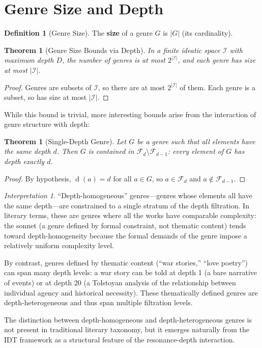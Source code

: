 \documentclass[11pt,openany]{book}
\theoremstyle{definition}
\newtheorem{definition}[axiom]{Definition}
\theoremstyle{plain}
\newtheorem{theorem}[axiom]{Theorem}
\theoremstyle{remark}
\newtheorem{interpretation}[axiom]{Interpretation}
\newcommand{\IS}{\mathcal{I}}               %
\newcommand{\depth}{\operatorname{d}}       %
\newcommand{\Filt}[1]{\mathcal{F}_{#1}}     %
\begin{document}
\section{Genre Size and Depth}

\begin{definition}[Genre Size]
The \textbf{size} of a genre $G$ is $|G|$ (its cardinality).
\end{definition}

\begin{theorem}[Genre Size Bounds via Depth]
In a finite ideatic space $\IS$ with maximum depth $D$, the number of genres is at most $2^{|\IS|}$, and each genre has size at most $|\IS|$.
\end{theorem}

\begin{proof}
Genres are subsets of $\IS$, so there are at most $2^{|\IS|}$ of them. Each genre is a subset, so has size at most $|\IS|$.
\end{proof}

While this bound is trivial, more interesting bounds arise from the interaction of genre structure with depth:

\begin{theorem}[Single-Depth Genre]
Let $G$ be a genre such that all elements have the same depth $d$. Then $G$ is contained in $\Filt{d} \setminus \Filt{d-1}$: every element of $G$ has depth exactly $d$.
\end{theorem}

\begin{proof}
By hypothesis, $\depth(a) = d$ for all $a \in G$, so $a \in \Filt{d}$ and $a \notin \Filt{d-1}$.
\end{proof}

\begin{interpretation}
``Depth-homogeneous'' genres---genres whose elements all have the same depth---are constrained to a single stratum of the depth filtration. In literary terms, these are genres where all the works have comparable complexity: the sonnet (a genre defined by formal constraint, not thematic content) tends toward depth-homogeneity because the formal demands of the genre impose a relatively uniform complexity level.

By contrast, genres defined by thematic content (``war stories,'' ``love poetry'') can span many depth levels: a war story can be told at depth 1 (a bare narrative of events) or at depth 20 (a Tolstoyan analysis of the relationship between individual agency and historical necessity). These thematically defined genres are depth-heterogeneous and thus span multiple filtration levels.

The distinction between depth-homogeneous and depth-heterogeneous genres is not present in traditional literary taxonomy, but it emerges naturally from the IDT framework as a structural feature of the resonance-depth interaction.
\end{interpretation}
\end{document}
